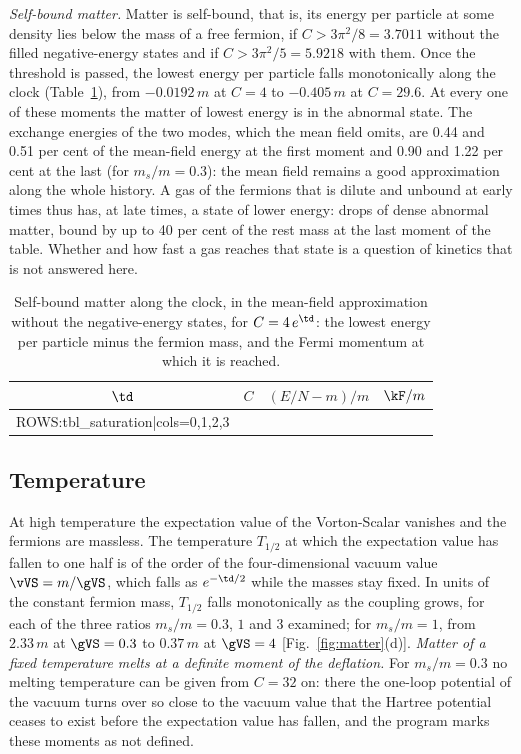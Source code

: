 \emph{Self-bound matter.} Matter is self-bound, that is, its energy per particle at some density
lies below the mass of a free fermion, if $C>3\pi^{2}/8=3.7011$ without the filled negative-energy
states and if $C>3\pi^{2}/5=5.9218$ with them. Once the threshold is passed, the lowest energy per
particle falls monotonically along the clock (Table~\ref{tab:saturation}), from $-0.0192\,m$ at
$C=4$ to $-0.405\,m$ at $C=29.6$. At every one of these moments the matter of lowest energy is in the
abnormal state. The exchange energies of the two modes, which the mean field omits, are 0.44 and
0.51 per cent of the mean-field energy at the first moment and 0.90 and 1.22 per cent at the last
(for $m_s/m=0.3$):
the mean field remains a good approximation along the whole history. A gas of the fermions that is
dilute and unbound at early times thus has, at late times, a state of lower energy: drops of dense
abnormal matter, bound by up to 40 per cent of the rest mass at the last moment of the table.
Whether and how fast a gas reaches that state is a question of kinetics that is not answered here.

\begin{table}
\caption{\label{tab:saturation}Self-bound matter along the clock, in the mean-field approximation
without the negative-energy states, for $C=4\,e^{\td}$: the lowest energy per particle minus the
fermion mass, and the Fermi momentum at which it is reached.}
\begin{ruledtabular}
\begin{tabular}{cccc}
$\td$ & $C$ & $(E/N-m)/m$ & $\kF/m$ \\
\hline
{{ROWS:tbl_saturation|cols=0,1,2,3}}
\end{tabular}
\end{ruledtabular}
\end{table}

\subsection{Temperature}

At high temperature the expectation value of the Vorton-Scalar vanishes and the fermions are
massless. The temperature $T_{1/2}$ at which the expectation value has fallen to one half is of the
order of the four-dimensional vacuum value $\vVS=m/\gVS$, which falls as $e^{-\td/2}$ while the
masses stay fixed. In units of the constant fermion mass, $T_{1/2}$ falls monotonically as the
coupling grows, for each of the three ratios $m_s/m=0.3$, $1$ and $3$ examined; for $m_s/m=1$, from
$2.33\,m$ at $\gVS=0.3$ to $0.37\,m$ at $\gVS=4$ [Fig.~\ref{fig:matter}(d)]. \emph{Matter of a fixed
temperature melts at a definite moment of the deflation.} For $m_s/m=0.3$ no melting temperature
can be given from $C=32$ on: there the one-loop potential of the vacuum turns over so close to the
vacuum value that the Hartree potential ceases to exist before the expectation value has fallen, and
the program marks these moments as not defined.


